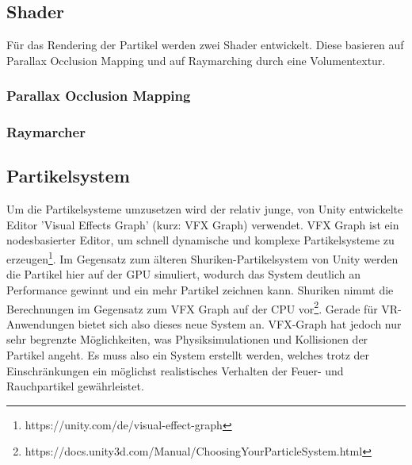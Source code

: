 \subsection{Shader}
Für das Rendering der Partikel werden zwei Shader entwickelt. Diese basieren auf Parallax Occlusion 
Mapping und auf Raymarching durch eine Volumentextur. 

\subsubsection{Parallax Occlusion Mapping}

\subsubsection{Raymarcher}

\subsection{Partikelsystem}
Um die Partikelsysteme umzusetzen wird der relativ junge, von Unity entwickelte Editor 'Visual Effects Graph' 
(kurz: VFX Graph) verwendet. VFX Graph ist ein nodesbasierter Editor, um schnell
dynamische und komplexe Partikelsysteme zu erzeugen\footnote{https://unity.com/de/visual-effect-graph}.
Im Gegensatz zum älteren Shuriken-Partikelsystem von Unity werden die Partikel hier auf der GPU
simuliert, wodurch das System deutlich an Performance gewinnt und ein mehr Partikel zeichnen kann. 
Shuriken nimmt die Berechnungen im Gegensatz zum VFX Graph auf der CPU vor\footnote{https://docs.unity3d.com/Manual/ChoosingYourParticleSystem.html}. 
Gerade für VR-Anwendungen bietet sich also dieses neue System an.
VFX-Graph hat jedoch nur sehr begrenzte Möglichkeiten, was Physiksimulationen und Kollisionen der Partikel angeht. 
Es muss also ein System erstellt werden, welches trotz der Einschränkungen ein möglichst realistisches 
Verhalten der Feuer- und Rauchpartikel gewährleistet.  




\newpage
